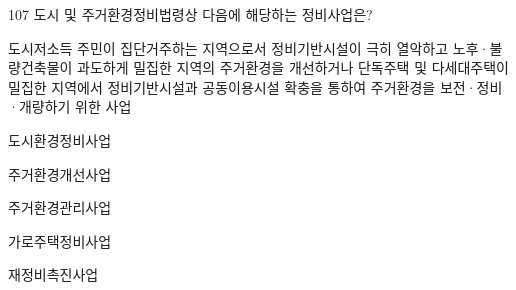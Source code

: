 \begin{question}{107}
도시 및 주거환경정비법령상 다음에 해당하는 정비사업은?
\begin{framedtext}
도시저소득 주민이 집단거주하는 지역으로서 정비기반시설이 극히 열악하고 노후·불량건축물이 과도하게 밀집한 지역의 주거환경을 개선하거나 단독주택 및 다세대주택이 밀집한 지역에서 정비기반시설과 공동이용시설 확충을 통하여 주거환경을 보전·정비·개량하기 위한 사업
\end{framedtext}
\begin{choices}
  \item 도시환경정비사업
  \item 주거환경개선사업
  \item 주거환경관리사업
  \item 가로주택정비사업
  \item 재정비촉진사업
\end{choices}
\end{question}
